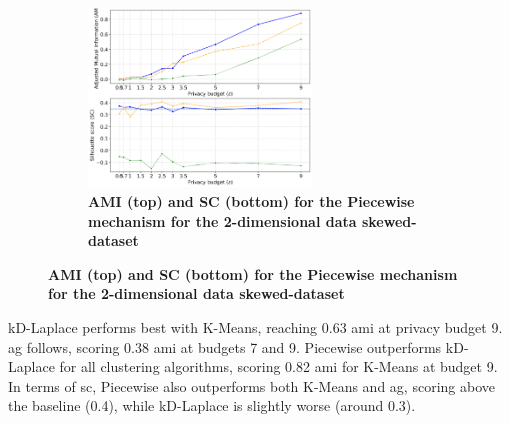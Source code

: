 \begin{figure}[H]
\begin{subfigure}{1\textwidth}
            \centering
            \caption{\textbf{AMI (top) and SC (bottom) for the Piecewise mechanism for the 2-dimensional data skewed-dataset}}
            \includegraphics[width=0.65\textwidth]{Results/kd-laplace/piecewise/skewed-dataset/ami-and-sc_2_dimensions.png}
      \end{subfigure}
      \label{fig:validation-skewed-dataset_comparison_2d-laplace}
\end{figure}
kD-Laplace performs best with K-Means, reaching 0.63 \gls{ami} at privacy budget 9.
\gls{ag} follows, scoring 0.38 \gls{ami} at budgets 7 and 9.
Piecewise outperforms kD-Laplace for all clustering algorithms, scoring 0.82 \gls{ami} for K-Means at budget 9.
In terms of \gls{sc}, Piecewise also outperforms both K-Means and \gls{ag}, scoring above the baseline (0.4), while kD-Laplace is slightly worse (around 0.3).
\newpage
